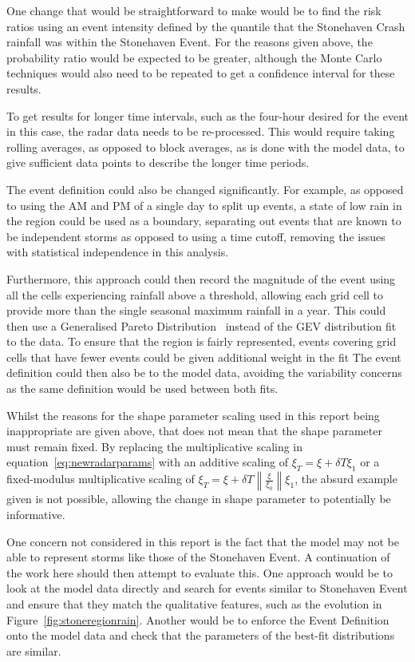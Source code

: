 One change that would be straightforward to make would be to find the risk ratios
    using an event intensity defined by the quantile that the Stonehaven Crash rainfall was within the Stonehaven Event.
For the reasons given above, the probability ratio would be expected to be greater,
    although the Monte Carlo techniques would also need to be repeated to get a confidence interval for these results.

To get results for longer time intervals,
    such as the four-hour desired for the event in this case,
    the radar data needs to be re-processed.
This would require taking rolling averages,
    as opposed to block averages,
    as is done with the model data,
    to give sufficient data points to describe the longer time periods.

The event definition could also be changed significantly.
For example,
    as opposed to using the AM and PM of a single day to split up events,
    a state of low rain in the region could be used as a boundary,
    separating out events that are known to be independent storms as opposed to using a time cutoff,
    removing the issues with statistical independence in this analysis.

Furthermore,
    this approach could then record the magnitude of the event using all the cells experiencing rainfall above a threshold,
    allowing each grid cell to provide more than the single seasonal maximum rainfall in a year.
This could then use a Generalised Pareto Distribution~\cite{Coles_2001} instead of the GEV distribution fit to the data.
To ensure that the region is fairly represented,
    events covering grid cells that have fewer events could be given additional weight in the fit
The event definition could then also be to the model data,
    avoiding the variability concerns as the same definition would be used between both fits.

Whilst the reasons for the shape parameter scaling used in this report being inappropriate are given above,
    that does not mean that the shape parameter must remain fixed.
By replacing the multiplicative scaling in equation~\ref{eq:newradarparams} with an additive scaling of
    $\xi_T = \xi + \delta T \xi_1$ or a fixed-modulus multiplicative scaling of $\xi_T = \xi + \delta T \left\| \frac{\xi}{\xi_0} \right\| \xi_1$,
    the absurd example given is not possible,
    allowing the change in shape parameter to potentially be informative.

One concern not considered in this report is the fact that the model may not be able to represent storms like those of the Stonehaven Event.
A continuation of the work here should then attempt to evaluate this.
One approach would be to look at the model data directly and
    search for events similar to Stonehaven Event and ensure that they match the qualitative features,
    such as the evolution in Figure~\ref{fig:stoneregionrain}.
Another would be to enforce the Event Definition onto the model data and check that the parameters of the best-fit distributions are similar.

